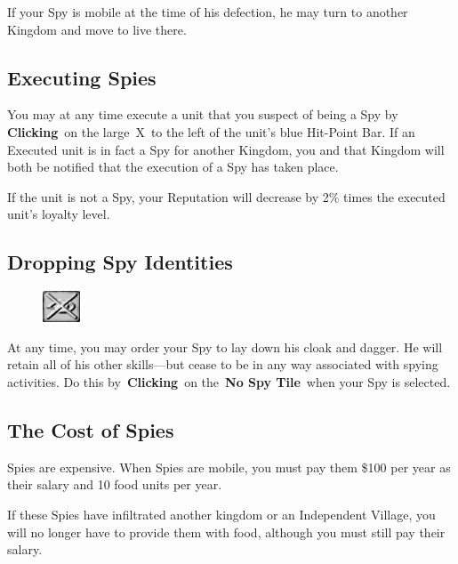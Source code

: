 If your Spy is mobile at the time of his defection, he may turn to another Kingdom and move to live there.

\subsection{Executing Spies}

You may at any time execute a unit that you suspect of being a Spy by \textbf{Clicking} on the large X to the left of the unit’s blue Hit-Point Bar. If an Executed unit is in fact a Spy for another Kingdom, you and that Kingdom will both be notified that the execution of a Spy has taken place.


If the unit is not a Spy, your Reputation will decrease by 2\% times the executed unit’s loyalty level.

\subsection{Dropping Spy Identities}

\begin{figure}
	\vspace{-20pt}
	\begin{center}
		\includegraphics[width=0.1\textwidth]{Tnospy}
	\end{center}
	\vspace{-20pt}
\end{figure}

At any time, you may order your Spy to lay down his cloak and dagger. He will retain all of his other skills---but cease to be in any way associated with spying activities. Do this by \textbf{Clicking} on the \textbf{No Spy Tile} when your Spy is selected.

\subsection{The Cost of Spies}

Spies are expensive. When Spies are mobile, you must pay them \$100 per year as their salary and 10 food units per year.

If these Spies have infiltrated another kingdom or an Independent Village, you will no longer have to provide them with food, although you must still pay their salary.


